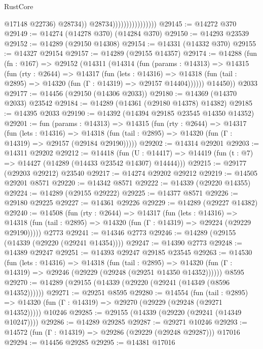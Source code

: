 \begin{lexlean}{RustCore}
\begin{coremodule}
                                          @17148
                                          @22736)
                                        @28734))
                                    @28734))))))))))))))))
@29145 := @14272 @370
@29149 := @14274 (@14278 @370) (@14284 @370)
@29150 := @14293 @23539
@29152 := @14289 (@29150 @14308)
@29154 := @14331 (@14332 @370)
@29155 := @14327 @29154
@29157 := @14289 (@29155 @14357)
@29174 := @14288
    (fun (fn : @167) =>
    @29152
      (@14311
        (@14314
          (fun (params : @14313) =>
          @14315
            (fun (rty : @2644) =>
            @14317
              (fun (lets : @14316) =>
              @14318 (fun (tail : @2895) => @14320 (fun (Γ : @14319) => @29157 @14404))))))
        @14450))
    @2033
@29177 := @14456 (@29150 (@14306 @2033))
@29180 := @14369 (@14370 @2033) @23542
@29184 := @14289 (@14361 (@29180 @14378) @14382)
@29185 := @14395 @2033
@29190 := @14392 (@14394 @29185 @23545 @14350 @14352)
@29201 := fun (params : @14313) =>
  @14315
    (fun (rty : @2644) =>
    @14317
      (fun (lets : @14316) =>
      @14318 (fun (tail : @2895) => @14320 (fun (Γ : @14319) => @29157 (@29184 @29190)))))
@29202 := @14314 @29201
@29203 := @14311 @29202
@29212 := @14418
    (fun (U : @14417) => @14419 (fun (t : @7) => @14427 (@14289 (@14433 @23542 @14307) @14444)))
@29215 := @29177 (@29203 @29212) @23540
@29217 := @14274 @29202 @29212
@29219 := @14505 @29201 @8571
@29220 := @14342 @8571
@29222 := @14339 (@29220 @14355)
@29224 := @14289 (@29155 @29222)
@29225 := @14377 @8571
@29226 := @29180 @29225
@29227 := @14361 @29226
@29229 := @14289 (@29227 @14382)
@29240 := @14508
    (fun (rty : @2644) =>
    @14317
      (fun (lets : @14316) =>
      @14318 (fun (tail : @2895) => @14320 (fun (Γ : @14319) => @29224 (@29229 @29190)))))
    @2773
@29241 := @14346 @2773
@29246 := @14289 (@29155 (@14339 (@29220 (@29241 @14354))))
@29247 := @14390 @2773
@29248 := @14389 @29247
@29251 := @14393 @29247 @29185 @23545
@29263 := @14530
    (fun (lets : @14316) =>
    @14318
      (fun (tail : @2895) =>
      @14320 (fun (Γ : @14319) => @29246 (@29229 (@29248 (@29251 @14350 @14352))))))
    @8595
@29270 := @14289 (@29155 (@14339 (@29220 (@29241 (@14349 (@8596 @14352))))))
@29271 := @29251 @8595
@29280 := @14554
    (fun (tail : @2895) => @14320 (fun (Γ : @14319) => @29270 (@29229 (@29248 (@29271 @14352)))))
    @10246
@29285 := @29155 (@14339 (@29220 (@29241 (@14349 @10247))))
@29286 := @14289 @29285
@29287 := @29271 @10246
@29293 := @14572 (fun (Γ : @14319) => @29286 (@29229 (@29248 @29287))) @17016
@29294 := @14456 @29285
@29295 := @14381 @17016

\end{coremodule}
\end{lexlean}
